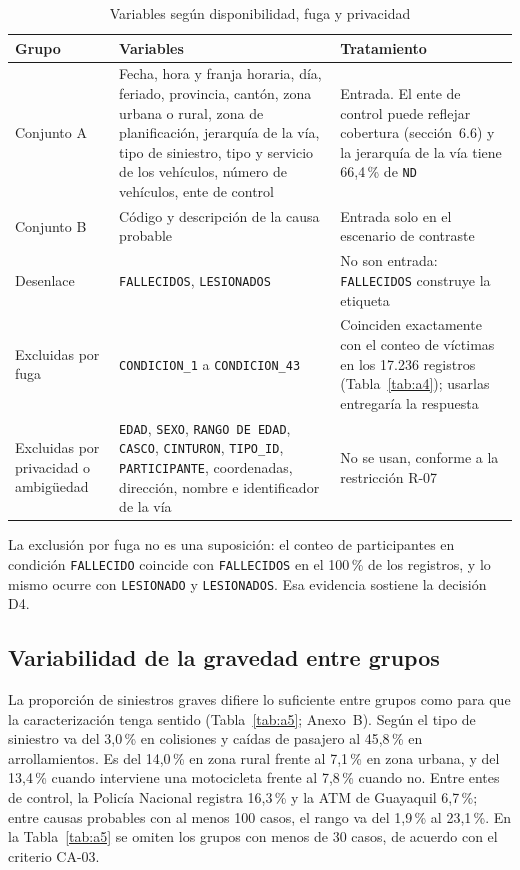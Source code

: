 \begin{table}[htbp]
\centering
\small
\caption{Variables según disponibilidad, fuga y privacidad}
\label{tab:variables}
\begin{tabularx}{\textwidth}{p{3.1cm}X p{4.6cm}}
\toprule
Grupo & Variables & Tratamiento \\
\midrule
Conjunto A & Fecha, hora y franja horaria, día, feriado, provincia, cantón, zona urbana o rural, zona de planificación, jerarquía de la vía, tipo de siniestro, tipo y servicio de los vehículos, número de vehículos, ente de control & Entrada. El ente de control puede reflejar cobertura (sección~6.6) y la jerarquía de la vía tiene 66,4\,\% de \texttt{ND} \\
Conjunto B & Código y descripción de la causa probable & Entrada solo en el escenario de contraste \\
Desenlace & \texttt{FALLECIDOS}, \texttt{LESIONADOS} & No son entrada: \texttt{FALLECIDOS} construye la etiqueta \\
Excluidas por fuga & \texttt{CONDICION\_1} a \texttt{CONDICION\_43} & Coinciden exactamente con el conteo de víctimas en los 17.236 registros (Tabla~\ref{tab:a4}); usarlas entregaría la respuesta \\
Excluidas por privacidad o ambigüedad & \texttt{EDAD}, \texttt{SEXO}, \texttt{RANGO DE EDAD}, \texttt{CASCO}, \texttt{CINTURON}, \texttt{TIPO\_ID}, \texttt{PARTICIPANTE}, coordenadas, dirección, nombre e identificador de la vía & No se usan, conforme a la restricción R-07 \\
\bottomrule
\end{tabularx}
\end{table}

La exclusión por fuga no es una suposición: el conteo de participantes en condición \texttt{FALLECIDO} coincide con \texttt{FALLECIDOS} en el 100\,\% de los registros, y lo mismo ocurre con \texttt{LESIONADO} y \texttt{LESIONADOS}. Esa evidencia sostiene la decisión D4.

\subsection{Variabilidad de la gravedad entre grupos}

La proporción de siniestros graves difiere lo suficiente entre grupos como para que la caracterización tenga sentido (Tabla~\ref{tab:a5}; Anexo~B). Según el tipo de siniestro va del 3,0\,\% en colisiones y caídas de pasajero al 45,8\,\% en arrollamientos. Es del 14,0\,\% en zona rural frente al 7,1\,\% en zona urbana, y del 13,4\,\% cuando interviene una motocicleta frente al 7,8\,\% cuando no. Entre entes de control, la Policía Nacional registra 16,3\,\% y la ATM de Guayaquil 6,7\,\%; entre causas probables con al menos 100 casos, el rango va del 1,9\,\% al 23,1\,\%. En la Tabla~\ref{tab:a5} se omiten los grupos con menos de 30 casos, de acuerdo con el criterio CA-03.

